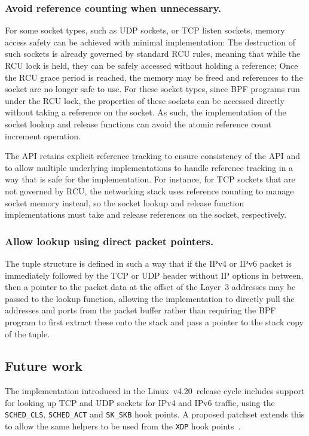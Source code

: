 \documentclass[10pt,sigconf,authorversion]{lpc}
\newcommand\linuxversion{{v4.20}}
\begin{document}
\subsubsection{Avoid reference counting when unnecessary.}

For some socket types, such as UDP sockets, or TCP listen sockets, memory
access safety can be achieved with minimal implementation: The destruction of
such sockets is already governed by standard RCU rules, meaning that while the
RCU lock is held, they can be safely accessed without holding a reference; Once
the RCU grace period is reached, the memory may be freed and references to the
socket are no longer safe to use. For these socket types, since BPF programs
run under the RCU lock, the properties of these sockets can be accessed
directly without taking a reference on the socket. As such, the implementation
of the socket lookup and release functions can avoid the atomic reference count
increment operation.

The API retains explicit reference tracking to ensure consistency of the API
and to allow multiple underlying implementations to handle reference tracking
in a way that is safe for the implementation. For instance, for  TCP sockets
that are not governed by RCU, the networking stack uses reference counting to
manage socket memory instead, so the socket lookup and release function
implementations must take and release references on the socket, respectively.

\subsubsection{Allow lookup using direct packet pointers.}

The tuple structure is defined in such a way that if the IPv4 or IPv6 packet is
immediately followed by the TCP or UDP header without IP options in between,
then a pointer to the packet data at the offset of the Layer~3 addresses may be
passed to the lookup function, allowing the implementation to directly pull the
addresses and ports from the packet buffer rather than requiring the BPF
program to first extract these onto the stack and pass a pointer to the stack
copy of the tuple.

\subsection{Future work}

The implementation introduced in the Linux~\linuxversion~release cycle includes
support for looking up TCP and UDP sockets for IPv4 and IPv6 traffic, using the
\verb+SCHED_CLS+, \verb+SCHED_ACT+ and \verb+SK_SKB+ hook points. A proposed
patchset extends this to allow the same helpers to be used from the \verb+XDP+
hook points~\cite{sk-lookup-xdp}.
\end{document}
